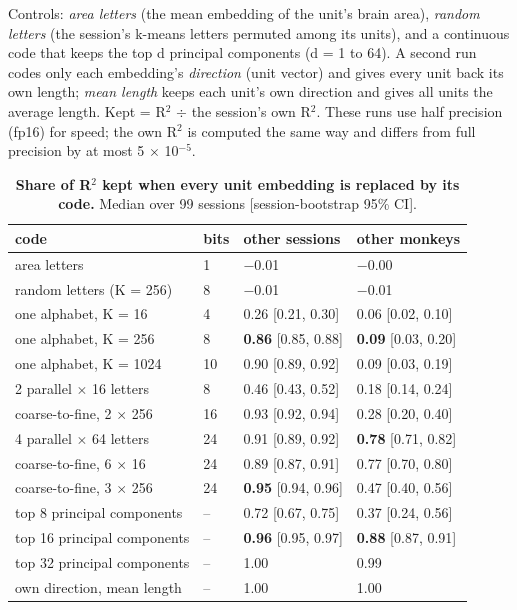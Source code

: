 \documentclass[11pt]{article}
\begin{document}
Controls: \emph{area letters} (the mean embedding of the unit's brain area), \emph{random letters} (the session's k-means letters permuted among its units), and a continuous code that keeps the top d principal components (d = 1 to 64). A second run codes only each embedding's \emph{direction} (unit vector) and gives every unit back its own length; \emph{mean length} keeps each unit's own direction and gives all units the average length. Kept = R$^{2}$ $\div$ the session's own R$^{2}$. These runs use half precision (fp16) for speed; the own R$^{2}$ is computed the same way and differs from full precision by at most 5 $\times$ 10$^{-5}$.

\begin{table}[!tbp]
\centering
\small
\caption{\textbf{Share of R$^{2}$ kept when every unit embedding is replaced by its code.} Median over 99 sessions [session-bootstrap 95\% CI].}
\begin{tabularx}{\linewidth}{Ylll}
\toprule
code & bits & other sessions & other monkeys \\
\midrule
area letters & 1 & $-$0.01 & $-$0.00 \\
random letters (K = 256) & 8 & $-$0.01 & $-$0.01 \\
one alphabet, K = 16 & 4 & 0.26 [0.21, 0.30] & 0.06 [0.02, 0.10] \\
one alphabet, K = 256 & 8 & \textbf{0.86} [0.85, 0.88] & \textbf{0.09} [0.03, 0.20] \\
one alphabet, K = 1024 & 10 & 0.90 [0.89, 0.92] & 0.09 [0.03, 0.19] \\
2 parallel $\times$ 16 letters & 8 & 0.46 [0.43, 0.52] & 0.18 [0.14, 0.24] \\
coarse-to-fine, 2 $\times$ 256 & 16 & 0.93 [0.92, 0.94] & 0.28 [0.20, 0.40] \\
4 parallel $\times$ 64 letters & 24 & 0.91 [0.89, 0.92] & \textbf{0.78} [0.71, 0.82] \\
coarse-to-fine, 6 $\times$ 16 & 24 & 0.89 [0.87, 0.91] & 0.77 [0.70, 0.80] \\
coarse-to-fine, 3 $\times$ 256 & 24 & \textbf{0.95} [0.94, 0.96] & 0.47 [0.40, 0.56] \\
top 8 principal components & -- & 0.72 [0.67, 0.75] & 0.37 [0.24, 0.56] \\
top 16 principal components & -- & \textbf{0.96} [0.95, 0.97] & \textbf{0.88} [0.87, 0.91] \\
top 32 principal components & -- & 1.00 & 0.99 \\
own direction, mean length & -- & 1.00 & 1.00 \\
\bottomrule
\end{tabularx}
\end{table}
\end{document}
